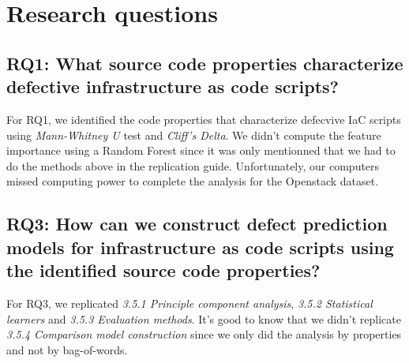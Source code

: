 
\section{Research questions}
\subsection{RQ1: What source code properties characterize defective infrastructure as code scripts?}
For RQ1, we identified the code properties that characterize defecvive IaC scripts
using \emph{Mann-Whitney U} test and \emph{Cliff's Delta}. We didn't 
compute the feature importance using a Random Forest since it was only mentionned 
that we had to do the methods above in the replication guide. Unfortunately, 
our computers missed computing power to complete the analysis for the Openstack 
dataset.
\subsection{RQ3: How can we construct defect prediction models for 
infrastructure as code scripts using the identified source code properties?}
For RQ3, we replicated \emph{3.5.1 Principle component analysis},  
\emph{3.5.2 Statistical learners} and \emph{3.5.3 Evaluation methods}. It's good 
to know that we didn't replicate \emph{3.5.4 Comparison model construction} since 
we only did the analysis by properties and not by bag-of-words.

